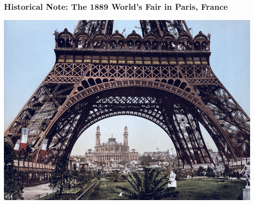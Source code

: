 \documentclass[mathserif,9pt]{beamer}
\begin{document}
\begin{frame}\frametitle{Historical Note: The  1889 World's Fair in Paris, France}\small
  \begin{center}
     \includegraphics[width=.9\textwidth]{eiffel.jpg}\hspace{1em}
  \end{center}
\end{frame}
\end{document}
